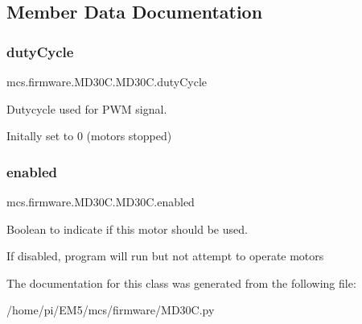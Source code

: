 \subsection{Member Data Documentation}
\mbox{\label{classmcs_1_1firmware_1_1MD30C_1_1MD30C_a26fa2e2b048c990aead0201e2eece808}} 
\subsubsection{\texorpdfstring{duty\+Cycle}{dutyCycle}}
{\footnotesize\ttfamily mcs.\+firmware.\+M\+D30\+C.\+M\+D30\+C.\+duty\+Cycle}



Dutycycle used for P\+WM signal. 

Initally set to 0 (motors stopped) \mbox{\label{classmcs_1_1firmware_1_1MD30C_1_1MD30C_a9c50566408c97597c1fa717f2381618b}} 
\subsubsection{\texorpdfstring{enabled}{enabled}}
{\footnotesize\ttfamily mcs.\+firmware.\+M\+D30\+C.\+M\+D30\+C.\+enabled}



Boolean to indicate if this motor should be used. 

If disabled, program will run but not attempt to operate motors 

The documentation for this class was generated from the following file\+:\begin{DoxyCompactItemize}
\item 
/home/pi/\+E\+M5/mcs/firmware/M\+D30\+C.\+py\end{DoxyCompactItemize}
